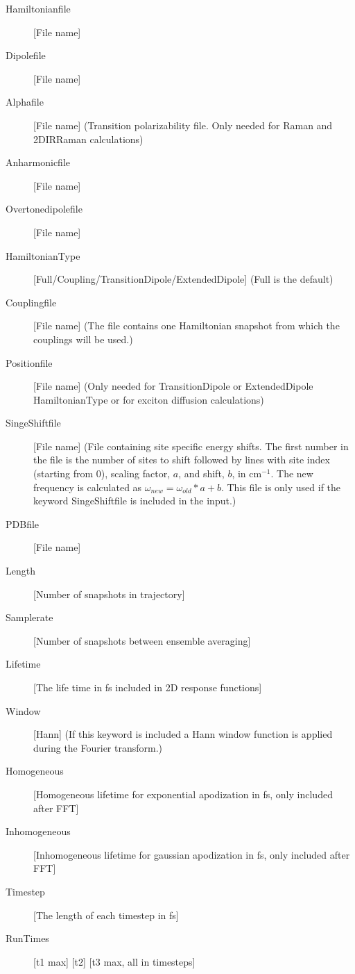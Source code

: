 \begin{description}
\item [Hamiltonianfile] [File name]
\item [Dipolefile] [File name]
\item [Alphafile] [File name] (Transition polarizability file. Only needed for Raman and 2DIRRaman calculations)
\item [Anharmonicfile] [File name]
\item [Overtonedipolefile] [File name]
\item [HamiltonianType] [Full/Coupling/TransitionDipole/ExtendedDipole] (Full is the default)
\item [Couplingfile] [File name] (The file contains one Hamiltonian snapshot from which the couplings will be used.)
\item [Positionfile] [File name] (Only needed for TransitionDipole or ExtendedDipole HamiltonianType or for exciton diffusion calculations)
\item [SingeShiftfile] [File name] (File containing site specific energy shifts.
The first number in the file is the number of sites to shift followed by lines with site index (starting from 0),
scaling factor, $a$, and shift, $b$, in cm$^{-1}$. The new frequency is calculated as $\omega_{{new}}=\omega_{{old}}*a+b$.  This file is only used if the keyword SingeShiftfile is included in the input.)
\item [PDBfile] [File name]
\item [Length] [Number of snapshots in trajectory] 
\item [Samplerate] [Number of snapshots between ensemble averaging]
\item [Lifetime] [The life time in fs included in 2D response functions]
\item [Window] [Hann] (If this keyword is included a Hann window function is applied during the Fourier transform.)
\item [Homogeneous] [Homogeneous lifetime for exponential apodization in fs, only included after FFT]
\item [Inhomogeneous] [Inhomogeneous lifetime for gaussian apodization in fs, only included after FFT]
\item [Timestep] [The length of each timestep in fs]
\item [RunTimes] [t1 max] [t2] [t3 max, all in timesteps]

\end{description}

